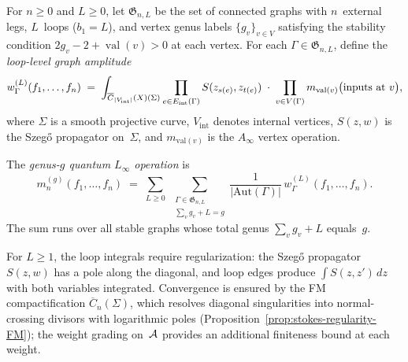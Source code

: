 \begin{definition}
\label{def:loop-level-graph-ops}
For $n \geq 0$ and $L \geq 0$, let
$\mathfrak{G}_{n,L}$ be the set of connected graphs with
$n$~external legs, $L$~loops ($b_1 = L$), and vertex genus
labels $\{g_v\}_{v \in V}$ satisfying the stability condition
$2g_v - 2 + \operatorname{val}(v) > 0$ at each vertex.
For each $\Gamma \in \mathfrak{G}_{n,L}$, define the
\emph{loop-level graph amplitude}
\begin{equation}\label{eq:loop-amplitude}
w_\Gamma^{(L)}(f_1, \ldots, f_n)
\;=\;
\int_{\overline{C}_{|V_{\mathrm{int}}|}(X)(\Sigma)}
\prod_{e \in E_{\mathrm{int}}(\Gamma)} S(z_{s(e)}, z_{t(e)})
\;\cdot\;
\prod_{v \in V(\Gamma)} m_{\mathrm{val}(v)}
\bigl(\text{inputs at } v\bigr),
\end{equation}
where $\Sigma$ is a smooth projective curve,
$V_{\mathrm{int}}$ denotes internal vertices, $S(z,w)$ is
the Szeg\H{o} propagator on~$\Sigma$, and
$m_{\mathrm{val}(v)}$ is the $A_\infty$ vertex operation.

The \emph{genus-$g$ quantum $L_\infty$ operation} is
\begin{equation}\label{eq:quantum-linf-operation}
m_n^{(g)}(f_1, \ldots, f_n)
\;=\;
\sum_{L \geq 0}\;
\sum_{\substack{\Gamma \in \mathfrak{G}_{n,L} \\
  \sum_v g_v + L = g}}
\frac{1}{|\mathrm{Aut}(\Gamma)|}
\, w_\Gamma^{(L)}(f_1, \ldots, f_n).
\end{equation}
The sum runs over all stable graphs whose total genus
$\sum_v g_v + L$ equals~$g$.

For $L \geq 1$, the loop integrals require regularization: the
Szeg\H{o} propagator $S(z,w)$ has a pole along the diagonal, and
loop edges produce $\int S(z,z')\, dz$ with both variables
integrated.  Convergence is ensured by the FM compactification
$\overline{C}_n(\Sigma)$, which resolves diagonal singularities
into normal-crossing divisors with logarithmic poles
(Proposition~\ref{prop:stokes-regularity-FM}); the
weight grading on~$\mathcal{A}$ provides an additional finiteness
bound at each weight.
\end{definition}

